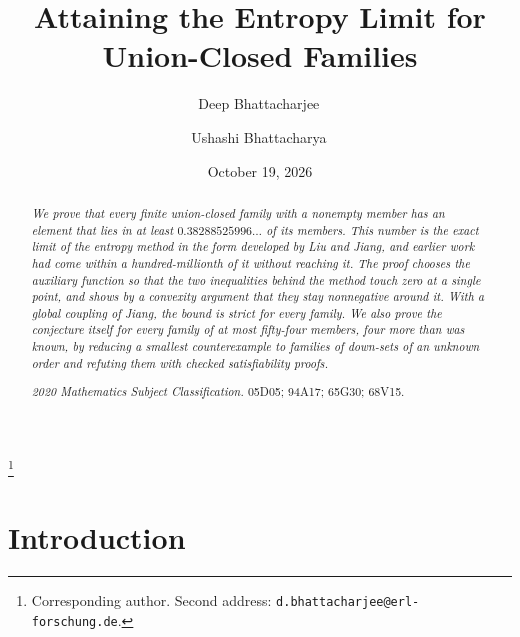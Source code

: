 \documentclass[aps,prd,twocolumn,superscriptaddress,nofootinbib,longbibliography,floatfix,amsmath,amssymb,10pt]{revtex4-2}
\theoremstyle{plain}
\theoremstyle{definition}
\theoremstyle{plain}
\begin{document}
\title{Attaining the Entropy Limit for Union-Closed Families}

\author{Deep Bhattacharjee\,}
\thanks{Corresponding author. Second address: \nolinkurl{d.bhattacharjee@erl-forschung.de}.}

\author{Ushashi Bhattacharya\,}

\date{October 19, 2026}

\begin{abstract}
\itshape
We prove that every finite union-closed family with a nonempty member has an element that lies in at least $0.38288525996\ldots$ of its members. This number is the exact limit of the entropy method in the form developed by Liu and Jiang, and earlier work had come within a hundred-millionth of it without reaching it. The proof chooses the auxiliary function so that the two inequalities behind the method touch zero at a single point, and shows by a convexity argument that they stay nonnegative around it. With a global coupling of Jiang, the bound is strict for every family. We also prove the conjecture itself for every family of at most fifty-four members, four more than was known, by reducing a smallest counterexample to families of down-sets of an unknown order and refuting them with checked satisfiability proofs.
\par\medskip\upshape\noindent\textit{2020 Mathematics Subject Classification.} 05D05; 94A17; 65G30; 68V15.
\end{abstract}


\maketitle
\makeatletter\renewcommand\l@subsection[2]{}\renewcommand\l@subsubsection[2]{}\makeatother
\tableofcontents

\section{Introduction}\label{sec:intro}
\end{document}
